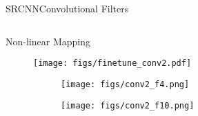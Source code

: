 \begin{frame}{SRCNN}{Convolutional Filters}
    \begin{columns}
        \begin{block}{Non-linear Mapping}
        \begin{figure}
            \texttt{[image: figs/finetune\_conv2.pdf]}
        \end{figure}

        \begin{figure}[H]
            \centering
            \begin{subfigure}[b]{0.40\textwidth}
            \centering
                \texttt{[image: figs/conv2\_f4.png]}
            \end{subfigure}
        \quad
            \begin{subfigure}[b]{0.40\textwidth}
            \centering
                \texttt{[image: figs/conv2\_f10.png]}
            \end{subfigure}
        \end{figure}
    \end{block}
\end{columns}
\end{frame}

